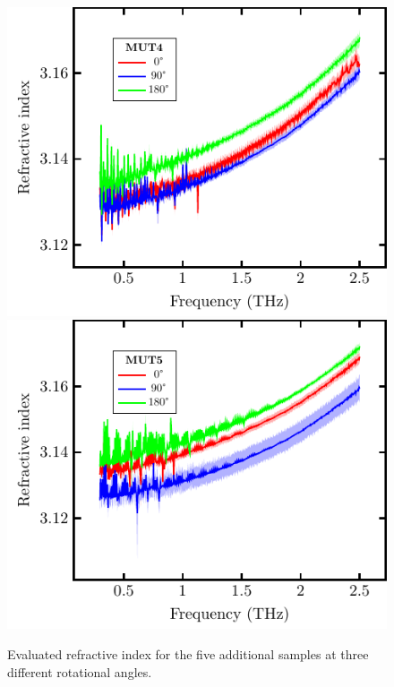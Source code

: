 \begin{figure}[H]
\qquad
\subcaptionbox{\label{fig:ceramic_MUT4}}
    {\hspace*{-2em}\includegraphics[width=0.45\linewidth]{images/7_appendix/plots/real/MUT4.pdf}}
\subcaptionbox{\label{fig:ceramic_MUT5}}
    {\includegraphics[width=0.45\linewidth]{images/7_appendix/plots/real/MUT5.pdf}}
\caption{Evaluated refractive index for the five additional samples at three different rotational angles.}
\label{fig:ceramic_MUTs}
\end{figure}

